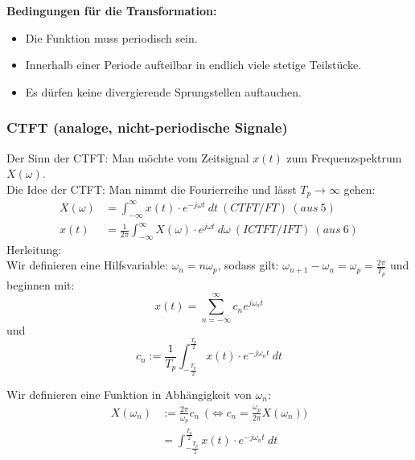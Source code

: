 \documentclass[12pt,a4paper]{scrartcl}
\begin{document}
  \noindent \textbf{Bedingungen für die Transformation:} 
  \begin{itemize}
  \item Die Funktion muss periodisch sein.
  \item  Innerhalb einer Periode aufteilbar in endlich viele stetige Teilstücke.
  \item Es dürfen keine divergierende Sprungstellen auftauchen.
  \end{itemize}

  \subsubsection{CTFT (analoge, nicht-periodische Signale)}
  \label{sec:sub:sub:ctft}

  \noindent Der Sinn der CTFT: Man möchte vom Zeitsignal $x(t)$ zum Frequenzspektrum $X(\omega)$. \\
  \noindent Die Idee der CTFT: Man nimmt die Fourierreihe und lässt $T_p \to \infty$ gehen: \\
  \begin{equation}
    \label{eq:4}
      \begin{split}
      X(\omega) &= \int_{-\infty}^{ \infty} x(t) \cdot e^{-j \omega t}\ d t\ (CTFT/FT) \ (aus\ 5) \\
      x(t) &= \frac{1}{2\pi} \int_{-\infty}^{ \infty} X(\omega) \cdot e^{j \omega t}\ d \omega\ (ICTFT/IFT) \ (aus\ 6) 
      \end{split}
    \end{equation}
 \noindent   Herleitung:\\
  \noindent Wir definieren eine Hilfsvariable: $\omega_n = n\omega_p$, sodass gilt:
  $\omega_{n+1} - \omega_n = \omega_p = \frac{2\pi}{T_p}$ und beginnen mit:
  $$x(t) = \sum_{n=-\infty}^{\infty} c_n e^{j \omega_n t}$$
  und
  $$c_n := \frac{1}{T_p}\int_{-\frac{T_p}{2}}^{\frac{T_p}{2}}x(t) \cdot e^{-j \omega_n t}\ dt$$

  \noindent Wir definieren eine Funktion in Abhängigkeit von $\omega_n$:
  \begin{equation}
  \label{eq:5}
    \begin{split}
    X(\omega_n) &:= \frac{2\pi}{\omega_p}c_n\ \ \big( \Leftrightarrow c_n = \frac{\omega_p}{2\pi}X(\omega_n)\big)\\
    &= \int_{-\frac{T_p}{2}}^{\frac{T_p}{2}}x(t) \cdot e^{-j \omega_n t}\ d t
    \end{split}
  \end{equation}
\end{document}
